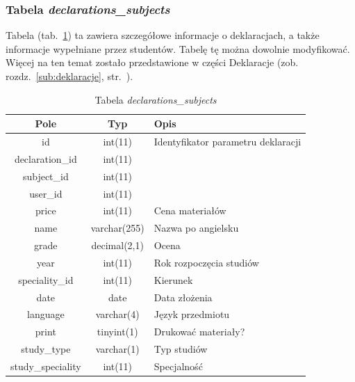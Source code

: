 \documentclass[a4paper,12pt,oneside]{report}
\begin{document}
\subsubsection{Tabela \emph{declarations\_subjects}}
\label{subsub:declarations_subjects}
Tabela (tab.~\ref{tab:declarations_subjects}) ta zawiera szczegółowe informacje o deklaracjach, a także informacje wypełniane przez studentów. Tabelę tę można dowolnie modyfikować. Więcej na ten temat zostało przedstawione w części Deklaracje (zob. rozdz.~\ref{sub:deklaracje}, str.~\pageref{sub:deklaracje}).

\begin{table}[h]
  \centering
  \begin{tabular}{|c|c|l|}\hline
  Pole & Typ & Opis \\\hline
  id   & int(11)   & Identyfikator parametru deklaracji\\
  declaration\_id   & int(11)      & \\
  subject\_id       & int(11)      & \\
  user\_id          & int(11)      & \\
  price             & int(11)      & Cena materiałów \\
  name              & varchar(255) & Nazwa po angielsku \\
  grade             & decimal(2,1) & Ocena \\
  year              & int(11)      & Rok rozpoczęcia studiów \\
  speciality\_id    & int(11)      & Kierunek \\
  date              & date         & Data złożenia \\
  language          & varchar(4)   & Język przedmiotu \\
  print             & tinyint(1)   & Drukować materiały? \\
  study\_type       & varchar(1)   & Typ studiów \\
  study\_speciality & int(11)      & Specjalność \\\hline
  \end{tabular}
  \caption{Tabela \emph{declarations\_subjects}\label{tab:declarations_subjects}}
\end{table}
\end{document}
